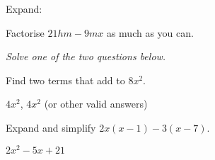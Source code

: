 \documentclass{quiz}
\begin{document}
\begin{questions}
\begin{answers}
\end{answers}

\question* Expand:


\begin{answers}
\end{answers}

\question Factorise $21hm - 9mx$ as much as you can. 
\vspace{3cm}

\end{questions}

\emph{Solve one of the two questions below.}
\begin{questions}

\question Find two terms that add to $8x^2$. \marginpar{\llap{[2]}}
\begin{answers}
    $4x^2$, $4x^2$ (or other valid answers)
\end{answers}

\question Expand and simplify $2x(x-1) - 3(x-7)$. 
\begin{answers}
    $2x^2 -5x + 21$
\end{answers}

\end{questions}
\end{document}

